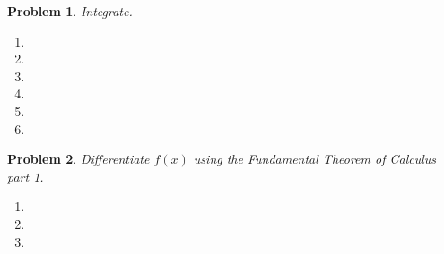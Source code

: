 \documentclass{article}
\renewcommand{\fcProblemRef}{\theproblem.\theenumi}
\newtheorem{problem}{Problem}
\begin{document}
\begin{problem}
Integrate.
\begin{multicols}{2}
\begin{enumerate}[ref={\fcProblemRef}]
\item 
\item %

\item 
\vfill
\item 
\item 
\item 
\end{enumerate}
\end{multicols}
\end{problem}

%



\begin{problem}Differentiate $f(x)$ using the Fundamental Theorem of Calculus part 1.
\begin{enumerate}[ref={\fcProblemRef}]
\item 
\item 
\item 
\end{enumerate}
\end{problem}

\end{document}
